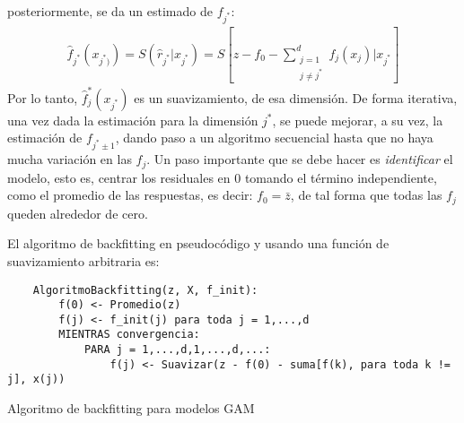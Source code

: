 \documentclass[../Main/Main.tex]{subfiles}
\begin{document}
posteriormente, se da un estimado de $f_{j^*}$:
\begin{align}
	\hat{f}_{j^*}(x_{j^*)}) = S(\hat{r}_{j^*}|x_{j^*}) = S[z - f_0 - \sum_{\substack{j=1\\ j \neq j^*}}^d f_j(x_j)|x_{j^*}]
\end{align}
Por lo tanto, $\hat{f}_j^*(x_{j^*})$ es un suavizamiento, de esa dimensión. De forma iterativa, una vez dada la estimación para la  dimensión $j^*$, se puede mejorar, a su vez, la estimación de $f_{j^*\pm 1}$, dando paso a un algoritmo secuencial hasta que no haya mucha variación en las $f_j$. Un paso importante que se debe hacer es \textit{identificar} el modelo, esto es, centrar los residuales en $0$ tomando el término independiente, como el promedio de las respuestas, es decir: $f_0 = \bar{z}$, de tal forma que todas las $f_j$ queden alrededor de cero. 

El algoritmo de backfitting en pseudocódigo y usando una función de suavizamiento arbitraria es:
\begin{table}
\makebox[\linewidth]{\rule{\textwidth}{0.4pt}}
\begin{verbatim}
    AlgoritmoBackfitting(z, X, f_init):
        f(0) <- Promedio(z)
        f(j) <- f_init(j) para toda j = 1,...,d
        MIENTRAS convergencia:
            PARA j = 1,...,d,1,...,d,...:
                f(j) <- Suavizar(z - f(0) - suma[f(k), para toda k != j], x(j)) 
\end{verbatim}
\makebox[\linewidth]{\rule{\textwidth}{0.4pt}}
\caption{Algoritmo de backfitting para modelos GAM}
\label{alg:Backfitting}
\end{table}
\end{document}
